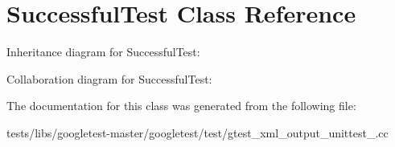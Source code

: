 \hypertarget{classSuccessfulTest}{}\section{Successful\+Test Class Reference}
\label{classSuccessfulTest}


Inheritance diagram for Successful\+Test\+:


Collaboration diagram for Successful\+Test\+:


The documentation for this class was generated from the following file\+:\begin{DoxyCompactItemize}
\item 
tests/libs/googletest-\/master/googletest/test/gtest\+\_\+xml\+\_\+output\+\_\+unittest\+\_\+.\+cc\end{DoxyCompactItemize}
